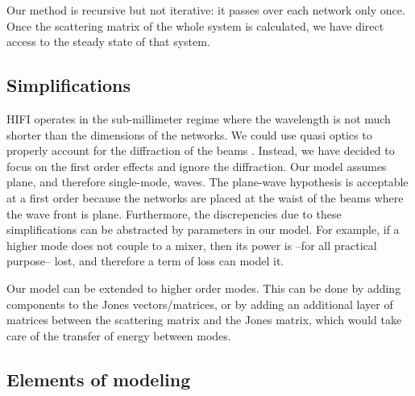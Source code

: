 \documentclass[a4paper,11pt]{article}
\begin{document}
Our method is recursive but not iterative: it passes over each network only once.
Once the scattering matrix of the whole system is calculated, we have direct access to the steady state of that system.




\subsection{Simplifications}

HIFI operates in the sub-millimeter regime where the wavelength is not much shorter than the dimensions of the networks.
We could use quasi optics to properly account for the diffraction of the beams \cite{goldsmith1998quasioptical}.
Instead, we have decided to focus on the first order effects and ignore the diffraction.
Our model assumes plane, and therefore single-mode, waves.
The plane-wave hypothesis is acceptable at a first order because the networks are placed at the waist of the beams where the wave front is plane.
Furthermore, the discrepencies due to these simplifications can be abstracted by parameters in our model.
For example, if a higher mode does not couple to a mixer, then its power is --for all practical purpose-- lost, and therefore a term of loss can model it.

Our model can be extended to higher order modes.
This can be done by adding components to the Jones vectors/matrices, or by adding an additional layer of matrices between the scattering matrix and the Jones matrix, which would take care of the transfer of energy between modes.




\subsection{Elements of modeling}
\end{document}
